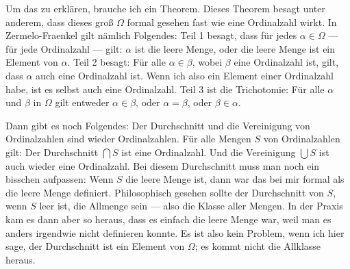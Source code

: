 \begin{spoken-clean}[00:36:15 - 00:37:50]
Um das zu erklären, brauche ich ein Theorem. Dieses Theorem besagt unter anderem, dass dieses groß $\Omega$ formal gesehen fast wie eine Ordinalzahl wirkt. In Zermelo-Fraenkel gilt nämlich Folgendes: Teil 1 besagt, dass für jedes $\alpha \in \Omega$ --- für jede Ordinalzahl --- gilt: $\alpha$ ist die leere Menge, oder die leere Menge ist ein Element von $\alpha$. Teil 2 besagt: Für alle $\alpha \in \beta$, wobei $\beta$ eine Ordinalzahl ist, gilt, dass $\alpha$ auch eine Ordinalzahl ist. Wenn ich also ein Element einer Ordinalzahl habe, ist es selbst auch eine Ordinalzahl. Teil 3 ist die Trichotomie: Für alle $\alpha$ und $\beta$ in $\Omega$ gilt entweder $\alpha \in \beta$, oder $\alpha = \beta$, oder $\beta \in \alpha$.

Dann gibt es noch Folgendes: Der Durchschnitt und die Vereinigung von Ordinalzahlen sind wieder Ordinalzahlen. Für alle Mengen $S$ von Ordinalzahlen gilt: Der Durchschnitt $\bigcap S$ ist eine Ordinalzahl. Und die Vereinigung $\bigcup S$ ist auch wieder eine Ordinalzahl. Bei diesem Durchschnitt muss man noch ein bisschen aufpassen: Wenn $S$ die leere Menge ist, dann war das bei mir formal als die leere Menge definiert. Philosophisch gesehen sollte der Durchschnitt von $S$, wenn $S$ leer ist, die Allmenge sein --- also die Klasse aller Mengen. In der Praxis kam es dann aber so heraus, dass es einfach die leere Menge war, weil man es anders irgendwie nicht definieren konnte. Es ist also kein Problem, wenn ich hier sage, der Durchschnitt ist ein Element von $\Omega$; es kommt nicht die Allklasse heraus.
\end{spoken-clean}

